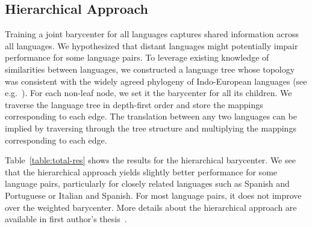 \documentclass{article}
\begin{document}
\subsection{Hierarchical Approach} 
Training a joint barycenter for all languages captures shared information across all languages. We hypothesized that distant languages might potentially impair performance for some language pairs. To leverage existing knowledge of similarities between languages, we constructed a language tree whose topology was consistent with the widely agreed phylogeny of Indo-European languages (see e.g.~\cite{gray2003language}). For each non-leaf node, we set it the barycenter for all its children. We traverse the language tree in depth-first order and store the mappings corresponding to each edge. The translation between any two languages can be implied by traversing through the tree structure and multiplying the mappings corresponding to each edge.

Table~\ref{table:total-res} shows the results for the hierarchical barycenter. We see that the hierarchical approach yields slightly better performance for some language pairs, particularly for closely related languages such as Spanish and Portuguese or Italian and Spanish. For most language pairs, it does not improve over the weighted barycenter. More details about the hierarchical approach are available in first author's thesis~\cite{Lian2020}.
\end{document}
